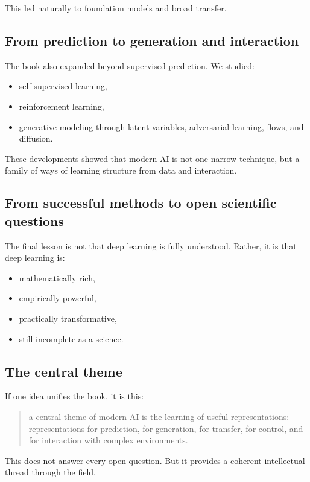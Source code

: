 \medskip

This led naturally to foundation models and broad transfer.

\subsection*{From prediction to generation and interaction}

The book also expanded beyond supervised prediction.
We studied:
\begin{itemize}
    \item self-supervised learning,
    \item reinforcement learning,
    \item generative modeling through latent variables, adversarial learning, flows, and diffusion.
\end{itemize}

These developments showed that modern AI is not one narrow technique, but a family of ways of learning structure from data and interaction.

\subsection*{From successful methods to open scientific questions}

The final lesson is not that deep learning is fully understood.
Rather, it is that deep learning is:
\begin{itemize}
    \item mathematically rich,
    \item empirically powerful,
    \item practically transformative,
    \item still incomplete as a science.
\end{itemize}

\subsection*{The central theme}

If one idea unifies the book, it is this:

\begin{quote}
a central theme of modern AI is the learning of useful representations:
representations for prediction, for generation, for transfer, for control, and for interaction with complex environments.
\end{quote}

This does not answer every open question.
But it provides a coherent intellectual thread through the field.

